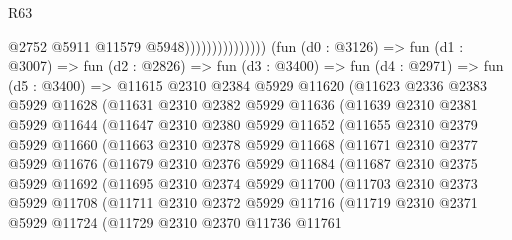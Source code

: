 \begin{lexlean}{R63}
\begin{coremodule}
                                      @2752
                                      @5911
                                      @11579
                                      @5948)))))))))))))))
        (fun (d0 : @3126) =>
        fun (d1 : @3007) =>
        fun (d2 : @2826) =>
        fun (d3 : @3400) =>
        fun (d4 : @2971) =>
        fun (d5 : @3400) =>
        @11615
          @2310
          @2384
          @5929
          @11620
          (@11623
            @2336
            @2383
            @5929
            @11628
            (@11631
              @2310
              @2382
              @5929
              @11636
              (@11639
                @2310
                @2381
                @5929
                @11644
                (@11647
                  @2310
                  @2380
                  @5929
                  @11652
                  (@11655
                    @2310
                    @2379
                    @5929
                    @11660
                    (@11663
                      @2310
                      @2378
                      @5929
                      @11668
                      (@11671
                        @2310
                        @2377
                        @5929
                        @11676
                        (@11679
                          @2310
                          @2376
                          @5929
                          @11684
                          (@11687
                            @2310
                            @2375
                            @5929
                            @11692
                            (@11695
                              @2310
                              @2374
                              @5929
                              @11700
                              (@11703
                                @2310
                                @2373
                                @5929
                                @11708
                                (@11711
                                  @2310
                                  @2372
                                  @5929
                                  @11716
                                  (@11719
                                    @2310
                                    @2371
                                    @5929
                                    @11724
                                    (@11729
                                      @2310
                                      @2370
                                      @11736
                                      @11761

\end{coremodule}
\end{lexlean}

